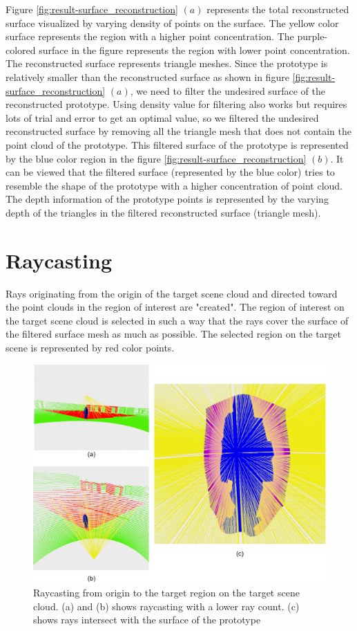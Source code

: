 Figure \ref{fig:result-surface_reconstruction} \((a)\) represents the total reconstructed surface visualized by varying density of points on the surface. The yellow color surface represents the region with a higher point concentration. The purple-colored surface in the figure represents the region with lower point concentration. The reconstructed surface represents triangle meshes. Since the prototype is relatively smaller than the reconstructed surface as shown in figure \ref{fig:result-surface_reconstruction} \((a)\), we need to filter the undesired surface of the reconstructed prototype. Using density value for filtering also works but requires lots of trial and error to get an optimal value, so we filtered the undesired reconstructed surface by removing all the triangle mesh that does not contain the point cloud of the prototype. This filtered surface of the prototype is represented by the blue color region in the figure \ref{fig:result-surface_reconstruction} \((b)\). It can be viewed that the filtered surface (represented by the blue color) tries to resemble the shape of the prototype with a higher concentration of point cloud. The depth information of the prototype points is represented by the varying depth of the triangles in the filtered reconstructed surface (triangle mesh).

\section{Raycasting}
Rays originating from the origin of the target scene cloud and directed toward the point clouds in the region of interest are "created". The region of interest on the target scene cloud is selected in such a way that the rays cover the surface of the filtered surface mesh as much as possible. The selected region on the target scene is represented by red color points.

\begin{figure}[htbp]
    \centering
    \includegraphics[width=1\linewidth]{97_graphics/results/raycasting_from_origin.pdf}
    \caption{Raycasting from origin to the target region on the target scene cloud. (a) and (b) shows raycasting with a lower ray count. (c) shows rays intersect with the surface of the prototype}
    \label{fig:result-raycasting_from_origin}
\end{figure}

